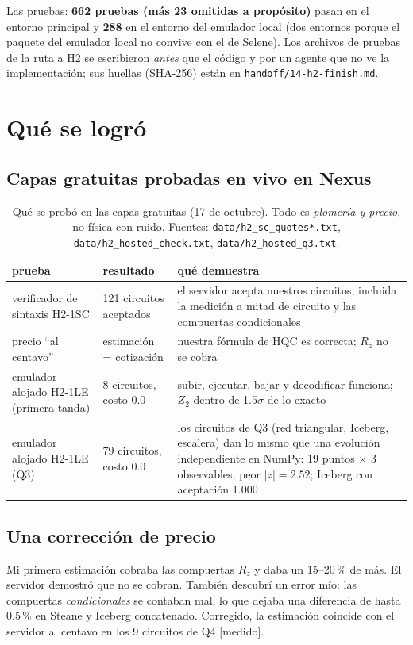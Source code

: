 \documentclass[11pt,a4paper]{article}
\newcommand{\code}[1]{\nolinkurl{#1}}
\begin{document}
Las pruebas: \textbf{662 pruebas (m\'as 23 omitidas a prop\'osito)} pasan en el entorno principal y \textbf{288} en el entorno del emulador local
(dos entornos porque el paquete del emulador local no convive con el de Selene). Los archivos de pruebas
de la ruta a H2 se escribieron \emph{antes} que el c\'odigo y por un agente que no ve la implementaci\'on; sus huellas
(SHA-256) est\'an en \code{handoff/14-h2-finish.md}.

\section{Qu\'e se logr\'o}

\subsection{Capas gratuitas probadas en vivo en Nexus}
\begin{table}[!ht]\centering\small
\caption{Qu\'e se prob\'o en las capas gratuitas (17 de octubre). Todo es \emph{plomer\'ia y precio}, no
f\'isica con ruido. Fuentes: \code{data/h2\_sc\_quotes*.txt}, \code{data/h2\_hosted\_check.txt},
\code{data/h2\_hosted\_q3.txt}.}
\begin{tabular}{p{4.3cm}p{3.1cm}p{6.6cm}}
\toprule
prueba & resultado & qu\'e demuestra\\
\midrule
verificador de sintaxis H2-1SC & 121 circuitos aceptados & el servidor acepta nuestros circuitos, incluida la medici\'on a mitad de circuito y las compuertas condicionales\\
precio ``al centavo'' & estimaci\'on = cotizaci\'on & nuestra f\'ormula de HQC es correcta; $R_z$ no se cobra\\
emulador alojado H2-1LE (primera tanda) & 8 circuitos, costo 0.0 & subir, ejecutar, bajar y decodificar funciona; $Z_2$ dentro de 1.5$\sigma$ de lo exacto\\
emulador alojado H2-1LE (Q3) & 79 circuitos, costo 0.0 & los circuitos de Q3 (red triangular, Iceberg, escalera) dan lo mismo que una evoluci\'on independiente en NumPy: 19 puntos $\times$ 3 observables, peor $|z|=2.52$; Iceberg con aceptaci\'on 1.000\\
\bottomrule
\end{tabular}
\end{table}

\subsection{Una correcci\'on de precio}
Mi primera estimaci\'on cobraba las compuertas $R_z$ y daba un 15--20\,\% de m\'as. El servidor demostr\'o que no
se cobran. Tambi\'en descubr\'i un error m\'io: las compuertas \emph{condicionales} se contaban mal, lo que
dejaba una diferencia de hasta 0.5\,\% en Steane y Iceberg concatenado. Corregido, la estimaci\'on coincide
con el servidor al centavo en los 9 circuitos de Q4 [medido].
\end{document}
